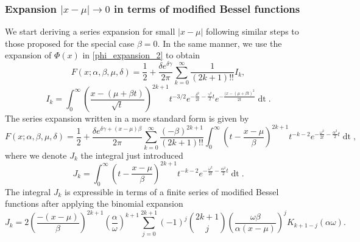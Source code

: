 \documentclass[10pt,a4paper,oneside]{article}
\numberwithin{equation}{section}
\begin{document}
\subsubsection{Expansion $|x-\mu| \to 0$ in terms of modified Bessel functions}
We start deriving a series expansion for small $|x-\mu|$ following similar steps to those proposed for the special case $\beta = 0$. In the same manner, we use the expansion of $\Phi(x)$ in  \eqref{phi_expansion_2} to obtain
\begin{equation}\label{general_series_xmu_zero_integral}
F(x;\alpha, \beta, \mu, \delta) = \frac{1}{2} + \frac{\delta e^{\delta \gamma}}{2\pi} \sum_{k=0}^{\infty} \frac{1}{(2k + 1)!!}I_k,
\end{equation}
\begin{equation}\label{general_xmu_zero_integral}
I_k = \int_0^{\infty} \left(\frac{x - (\mu +\beta t)}{\sqrt{t}}\right)^{2k+1} t^{-3/2} e^{-\frac{\delta^2}{2t} - \frac{\gamma^2}{2}t} e^{- \frac{(x-(\mu + \beta t)^2}{2t}} \mathop{dt}.
\end{equation}
The series expansion written in a more standard form is given by
\begin{equation}\label{general_series_xmu_zero_integral_2}
F(x;\alpha, \beta, \mu, \delta) = \frac{1}{2} + \frac{\delta e^{\delta \gamma + (x -\mu)\beta}}{2\pi}\sum_{k=0}^{\infty} \frac{(-\beta)^{2k+1}}{(2k + 1)!!}\int_0^{\infty} \left(t - \frac{x-\mu}{\beta}\right)^{2k+1} t^{-k-2} e^{-\frac{\omega^2}{2t} - \frac{\alpha^2}{2}t} \mathop{dt},
\end{equation}
where we denote $J_k$ the integral just introduced
\begin{equation}
J_k = \int_0^{\infty} \left(t - \frac{x-\mu}{\beta}\right)^{2k+1} t^{-k-2} e^{-\frac{\omega^2}{2t} - \frac{\alpha^2}{2}t} \mathop{dt}.
\end{equation}
The integral $J_k$ is expressible in terms of a finite series of modified Bessel functions after applying the binomial expansion
\begin{equation}
J_k = 2 \left(\frac{-(x-\mu)}{\beta}\right)^{2k+1} \left(\frac{\alpha}{\omega}\right)^{k+1} \sum_{j=0}^{2k+1} (-1)^j \binom{2k+1}{j} \left(\frac{\omega \beta}{\alpha (x-\mu)}\right)^j K_{k + 1 - j}(\alpha \omega).
\end{equation}
\end{document}
